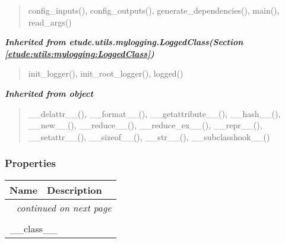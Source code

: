 \begin{quote}
config\_inputs(), config\_outputs(), generate\_dependencies(), main(), read\_args()
\end{quote}

\large{\textbf{\textit{Inherited from etude.utils.mylogging.LoggedClass\textit{(Section \ref{etude:utils:mylogging:LoggedClass})}}}}

\begin{quote}
init\_logger(), init\_root\_logger(), logged()
\end{quote}

\large{\textbf{\textit{Inherited from object}}}

\begin{quote}
\_\_delattr\_\_(), \_\_format\_\_(), \_\_getattribute\_\_(), \_\_hash\_\_(), \_\_new\_\_(), \_\_reduce\_\_(), \_\_reduce\_ex\_\_(), \_\_repr\_\_(), \_\_setattr\_\_(), \_\_sizeof\_\_(), \_\_str\_\_(), \_\_subclasshook\_\_()
\end{quote}


  \subsubsection{Properties}

    \vspace{-1cm}
\hspace{\varindent}\begin{longtable}{|p{\varnamewidth}|p{\vardescrwidth}|l}
\cline{1-2}
\cline{1-2} \centering \textbf{Name} & \centering \textbf{Description}& \\
\cline{1-2}
\endhead\cline{1-2}\multicolumn{3}{r}{\small\textit{continued on next page}}\\\endfoot\cline{1-2}
\endlastfoot\multicolumn{2}{|l|}{\textit{Inherited from object}}\\
\multicolumn{2}{|p{\varwidth}|}{\raggedright \_\_class\_\_}\\
\cline{1-2}
\end{longtable}



